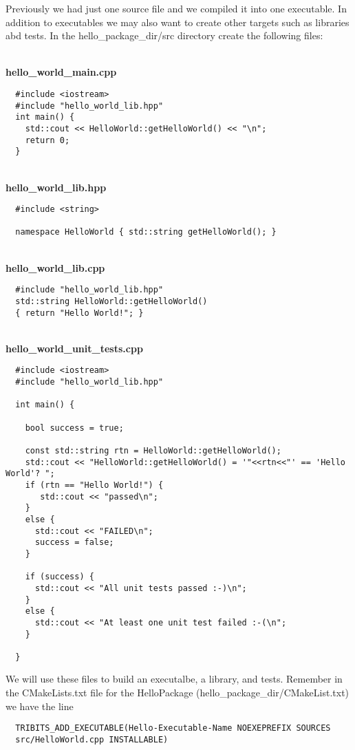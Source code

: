 \documentclass[12pt]{article}
\begin{document}
Previously we had just one source
file and we compiled it into one executable.  In addition to
executables we may also want to create other targets such as libraries
abd tests.  In the hello\_package\_dir/src directory create the
following files:
 
\textbf{\\hello\_world\_main.cpp}
\begin{verbatim}
  #include <iostream>
  #include "hello_world_lib.hpp"
  int main() {
    std::cout << HelloWorld::getHelloWorld() << "\n";
    return 0;
  }
\end{verbatim}

\textbf{\\hello\_world\_lib.hpp}
\begin{verbatim}
  #include <string>
  
  namespace HelloWorld { std::string getHelloWorld(); }
\end{verbatim}

\textbf{\\hello\_world\_lib.cpp}
\begin{verbatim}
  #include "hello_world_lib.hpp"
  std::string HelloWorld::getHelloWorld()
  { return "Hello World!"; }
\end{verbatim}

\textbf{\\hello\_world\_unit\_tests.cpp}
\begin{verbatim}
  #include <iostream>
  #include "hello_world_lib.hpp"
  
  int main() {
  
    bool success = true;
  
    const std::string rtn = HelloWorld::getHelloWorld();
    std::cout << "HelloWorld::getHelloWorld() = '"<<rtn<<"' == 'Hello World'? ";
    if (rtn == "Hello World!") {
       std::cout << "passed\n";
    }
    else {
      std::cout << "FAILED\n";
      success = false;
    }
  
    if (success) {
      std::cout << "All unit tests passed :-)\n";
    }
    else {
      std::cout << "At least one unit test failed :-(\n";
    }
  
  }
\end{verbatim}

We will use these files to build an executalbe, a library, and tests.
Remember in the CMakeLists.txt file for the HelloPackage
(hello\_package\_dir/CMakeList.txt) we have the line

\begin{verbatim}
  TRIBITS_ADD_EXECUTABLE(Hello-Executable-Name NOEXEPREFIX SOURCES
  src/HelloWorld.cpp INSTALLABLE)
\end{verbatim}
\end{document}
